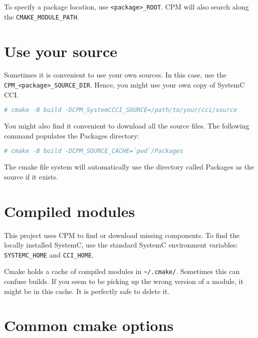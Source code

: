 To specify a package location, use {\small{\lstinline!<package>_ROOT!}}. CPM will also search along the {\small{\lstinline!CMAKE_MODULE_PATH!}}. \leavevmode


\section{Use your source}

Sometimes it is convenient to use your own sources. In this case, use the {\small{\lstinline!CPM_<package>_SOURCE_DIR!}}. Hence, you might use your own copy of SystemC CCI.

\small
\begin{lstlisting}[language=bash]
    # cmake -B build -DCPM_SystemCCCI_SOURCE=/path/to/your/cci/source
\end{lstlisting}
\normalsize

You might also find it convenient to download all the source files. The following command populates the Packages directory:

\small
\begin{lstlisting}[language=bash]
    # cmake -B build -DCPM_SOURCE_CACHE=`pwd`/Packages
\end{lstlisting}
\normalsize

\note The cmake file system will automatically use the directory called Packages as the source if it exists.


\section{Compiled modules}

This project uses CPM {} to find or download missing components. To find the locally installed SystemC, use the standard SystemC environment variables: {\small{\lstinline!SYSTEMC_HOME!}} and {\small{\lstinline!CCI_HOME!}}.

Cmake holds a cache of compiled modules in {\small{\lstinline!~/.cmake/!}}. Sometimes this can confuse builds. If you seem to be picking up the wrong version of a module, it might be in this cache. It is perfectly safe to delete it.


\clearpage
\section{Common cmake options}

